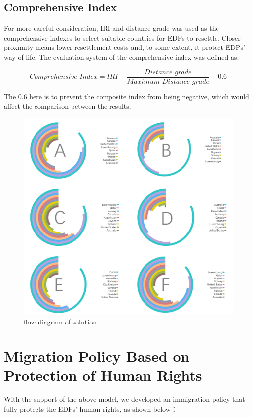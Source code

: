 \documentclass[12pt]{article}  %
\begin{document}
\subsection{Comprehensive Index}
For more careful consideration, IRI and distance grade was used as the comprehensive indexes to select suitable countries for EDPs to resettle. Closer proximity means lower resettlement costs and, to some extent, it protect EDPs' way of life. The evaluation system of the comprehensive index was defined as:

\begin{equation}
    Comprehensive\,\,Index=IRI-\frac{Distance\,\,grade}{Maximum\,\,Distance\,\,grade}+0.6
\end{equation}


The 0.6 here is to prevent the composite index from being negative, which would affect the comparison between the results.

\begin{figure}[htbp]
	\centering
	\includegraphics[width=.8\textwidth]{ABCDEF.png}
	\caption{ flow diagram of solution}\label{ABCDEF}
\end{figure}


\newpage

\section{Migration Policy Based on Protection of Human Rights}
With the support of the above model, we developed an immigration policy that fully protects the EDPs' human rights, as shown below：
\end{document}

